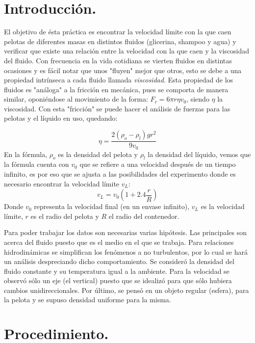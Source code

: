 \documentclass[a4paper]{article}
\begin{document}
\section*{Introducción.}
El objetivo de ésta práctica es encontrar la velocidad límite con la que caen pelotas de diferentes masas en distintos fluidos (glicerina, shampoo y agua) y verificar que existe una relación entre la velocidad con la que caen y la viscosidad del fluido.
Con frecuencia en la vida cotidiana se vierten fluidos en distintas ocasiones y es fácil notar que unos "fluyen" mejor que otros, esto se debe a una propiedad intrínseca a cada fluido llamada \textit{viscosidad}. Esta propiedad de los fluidos es "análoga" a la fricción en mecánica, pues se comporta de manera similar, oponiéndose al movimiento de la forma: $F_{r}=6\pi r \eta v_0$, siendo $\eta$ la viscosidad. Con esta "fricción" se puede hacer el análisis de fuerzas para las pelotas y el líquido en uso, quedando:

\begin{equation}
    \eta = \frac{2(\rho_o - \rho_l)gr^2}{9v_0}
\end{equation}
En la fórmula, $\rho_o$ es la densidad del pelota y $\rho_l$ la densidad del líquido, vemos que la fórmula cuenta con $v_0$ que se refiere a una velocidad después de un tiempo infinito, es por eso que se ajusta a las posibilidades del experimento donde es necesario encontrar la velocidad límite $v_L$:
\begin{equation}
    v_L = v_0 \left(1+2.4\frac{r}{R}\right)
\end{equation}
Donde $v_0$ representa la velocidad final (en un envase infinito), $v_L$ es la velocidad límite, $r$ es el radio del pelota y $R$ el radio del contenedor.

Para poder trabajar los datos son necesarias varias hipótesis. Las principales son acerca del fluido puesto que es el medio en el que se trabaja. Para relaciones hidrodinámicas se simplifican los fenómenos a no turbulentos, por lo cual se hará un análisis despreciando dicho comportamiento. Se consideró la densidad del fluido constante y su temperatura igual a la ambiente. Para la velocidad se observó sólo un eje (el vertical) puesto que se idealizó para que sólo hubiera cambios unidireccionales. Por último, se pensó en un objeto regular (esfera), para la pelota y se supuso densidad uniforme para la misma. 

\section*{Procedimiento.}
\end{document}
